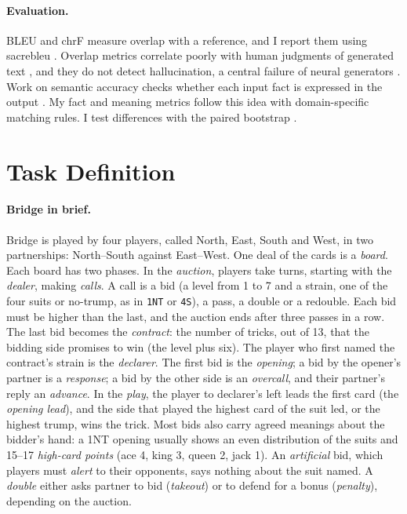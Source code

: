 \documentclass[11pt]{article}
\begin{document}
\paragraph{Evaluation.} BLEU \citep{papineni2002bleu} and chrF \citep{popovic2015chrf} measure overlap with a reference, and I report them using sacrebleu \citep{post2018call}. Overlap metrics correlate poorly with human judgments of generated text \citep{belz2006comparing}, and they do not detect hallucination, a central failure of neural generators \citep{ji2023hallucination}. Work on semantic accuracy checks whether each input fact is expressed in the output \citep{dusek2020evaluating}. My fact and meaning metrics follow this idea with domain-specific matching rules. I test differences with the paired bootstrap \citep{koehn2004statistical}.

\section{Task Definition}

\paragraph{Bridge in brief.} Bridge is played by four players, called North, East, South and West, in two partnerships: North--South against East--West. One deal of the cards is a \emph{board}. Each board has two phases. In the \emph{auction}, players take turns, starting with the \emph{dealer}, making \emph{calls}. A call is a bid (a level from 1 to 7 and a strain, one of the four suits or no-trump, as in \texttt{1NT} or \texttt{4S}), a pass, a double or a redouble. Each bid must be higher than the last, and the auction ends after three passes in a row. The last bid becomes the \emph{contract}: the number of tricks, out of 13, that the bidding side promises to win (the level plus six). The player who first named the contract's strain is the \emph{declarer}. The first bid is the \emph{opening}; a bid by the opener's partner is a \emph{response}; a bid by the other side is an \emph{overcall}, and their partner's reply an \emph{advance}. In the \emph{play}, the player to declarer's left leads the first card (the \emph{opening lead}), and the side that played the highest card of the suit led, or the highest trump, wins the trick. Most bids also carry agreed meanings about the bidder's hand: a 1NT opening usually shows an even distribution of the suits and 15--17 \emph{high-card points} (ace 4, king 3, queen 2, jack 1). An \emph{artificial} bid, which players must \emph{alert} to their opponents, says nothing about the suit named. A \emph{double} either asks partner to bid (\emph{takeout}) or to defend for a bonus (\emph{penalty}), depending on the auction.
\end{document}
